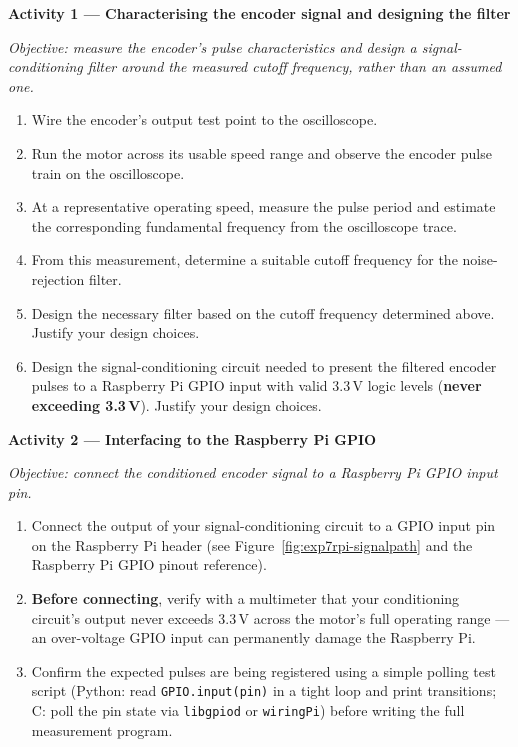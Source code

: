 \begin{procedure}

  \textbf{Activity 1 --- Characterising the encoder signal and designing the filter}\vspace{2pt}

  \textit{Objective: measure the encoder's pulse characteristics and design a signal-conditioning filter around the measured cutoff frequency, rather than an assumed one.}

  \begin{enumerate}
    \item Wire the encoder's output test point to the oscilloscope.
    \item Run the motor across its usable speed range and observe the encoder pulse train on the oscilloscope.
    \item At a representative operating speed, measure the pulse period and estimate the corresponding fundamental frequency from the oscilloscope trace.
    \item From this measurement, determine a suitable cutoff frequency for the noise-rejection filter.\newpage
    \item Design the necessary filter based on the cutoff frequency determined above. Justify your design choices.
    \item Design the signal-conditioning circuit needed to present the filtered encoder pulses to a Raspberry Pi GPIO input with valid 3.3\,V logic levels (\textbf{never exceeding 3.3\,V}). Justify your design choices.
  \end{enumerate}
  \vspace*{1.5em}

  \textbf{Activity 2 --- Interfacing to the Raspberry Pi GPIO}\vspace{2pt}

  \textit{Objective: connect the conditioned encoder signal to a Raspberry Pi GPIO input pin.}

  \begin{enumerate}
    \item Connect the output of your signal-conditioning circuit to a GPIO input pin on the Raspberry Pi header (see Figure~\ref{fig:exp7rpi-signalpath} and the Raspberry Pi GPIO pinout reference).
    \item \textbf{Before connecting}, verify with a multimeter that your conditioning circuit's output never exceeds 3.3\,V across the motor's full operating range --- an over-voltage GPIO input can permanently damage the Raspberry Pi.
    \item Confirm the expected pulses are being registered using a simple polling test script (Python: read \texttt{GPIO.input(pin)} in a tight loop and print transitions; C: poll the pin state via \texttt{libgpiod} or \texttt{wiringPi}) before writing the full measurement program.
  \end{enumerate}


\end{procedure}
